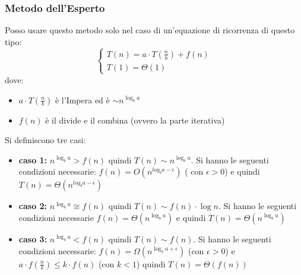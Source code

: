 \documentclass[a4paper,12pt, oneside]{book}
\begin{document}
\begin{shaded}
  \subsubsection{Metodo dell'Esperto}
  Posso usare questo metodo solo nel caso di un'equazione di ricorrenza di questo tipo:
  $$\begin{cases}
    T(n)=a\cdot T\left(\frac{n}{b}\right) +f(n) \\
    T(1)=\Theta(1)
  \end{cases}$$
  dove:
  \begin{itemize}
    \item $a\cdot T\left(\frac{n}{b}\right)$ è l'Impera ed è $\sim n^{\log_b a}$
    \item $f(n)$ è il divide e il combina (ovvero la parte iterativa)
  \end{itemize}
  Si definiscono tre casi:
  \begin{itemize}
    \item \textbf{caso 1:} $n^{\log_b a}>f(n)$ quindi $T(n)\sim n^{\log_b a}$. Si hanno le seguenti condizioni necessarie: $f(n)=O(n^{log_b a -\epsilon})$ ( con $\epsilon>0$) e quindi $T(n)=\Theta(n^{log_b a -\epsilon})$
    \item \textbf{caso 2:} $n^{\log_b a}\cong f(n)$ quindi $T(n)\sim f(n)\cdot \log n$. Si hanno le seguenti condizioni necessarie $f(n)=\Theta(n^{\log_b a})$ e quindi $T(n)=\Theta(n^{\log_b a})$
    \item \textbf{caso 3:} $n^{\log_b a}< f(n)$ quindi $T(n)\sim f(n)$. Si hanno le seguenti condizioni necessarie: $f(n)=\Omega(n^{\log_b a +\epsilon})$ (con $\epsilon>0$) e $a\cdot f\left(\frac{n}{b}
    \right)\leq k\cdot f(n)$ (con $k<1$) quindi $T(n)=\Theta(f(n))$
  \end{itemize}


\end{shaded}
\end{document}
